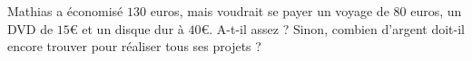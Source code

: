 
\begin{exercice}\label{exosmath-0746}

    Mathias a économisé \( 130\) euros, mais voudrait se payer un voyage de \( 80\) euros, un DVD de \( 15\)€ et un disque dur à \( 40\)€. A-t-il assez ? Sinon, combien d'argent doit-il encore trouver pour réaliser tous ses projets ?

\end{exercice}
